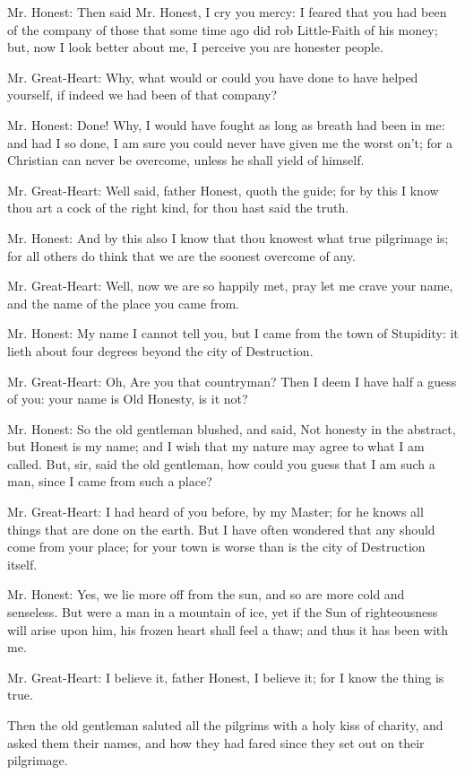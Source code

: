 Mr. Honest: Then said Mr. Honest, I cry you mercy: I feared that you had been of the company of those that some time ago did rob Little-Faith of his money; but, now I look better about me, I perceive you are honester people.

Mr. Great-Heart: Why, what would or could you have done to have helped yourself, if indeed we had been of that company?

Mr. Honest: Done! Why, I would have fought as long as breath had been in me: and had I so done, I am sure you could never have given me the worst on't; for a Christian can never be overcome, unless he shall yield of himself.

Mr. Great-Heart: Well said, father Honest, quoth the guide; for by this I know thou art a cock of the right kind, for thou hast said the truth.

Mr. Honest: And by this also I know that thou knowest what true pilgrimage is; for all others do think that we are the soonest overcome of any.

Mr. Great-Heart: Well, now we are so happily met, pray let me crave your name, and the name of the place you came from.

Mr. Honest: My name I cannot tell you, but I came from the town of Stupidity: it lieth about four degrees beyond the city of Destruction.

Mr. Great-Heart: Oh, Are you that countryman? Then I deem I have half a guess of you: your name is Old Honesty, is it not?

Mr. Honest: So the old gentleman blushed, and said, Not honesty in the abstract, but Honest is my name; and I wish that my nature may agree to what I am called. But, sir, said the old gentleman, how could you guess that I am such a man, since I came from such a place?

Mr. Great-Heart: I had heard of you before, by my Master; for he knows all things that are done on the earth. But I have often wondered that any should come from your place; for your town is worse than is the city of Destruction itself.

Mr. Honest: Yes, we lie more off from the sun, and so are more cold and senseless. But were a man in a mountain of ice, yet if the Sun of righteousness will arise upon him, his frozen heart shall feel a thaw; and thus it has been with me.

Mr. Great-Heart: I believe it, father Honest, I believe it; for I know the thing is true.

Then the old gentleman saluted all the pilgrims with a holy kiss of charity, and asked them their names, and how they had fared since they set out on their pilgrimage.

